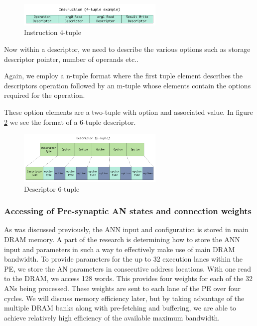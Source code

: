 \documentclass[journal]{IEEEtran}
\begin{document}
\begin{figure}[!t]
\centerline{
\mbox{\includegraphics[width=2.75in]{instructionTuple.jpg}}
}
\caption{Instruction 4-tuple}
\label{fig:instructionTuple}
\end{figure}

Now within a descriptor, we need to describe the various options such as storage descriptor pointer, number of operands etc..

Again, we employ a n-tuple format where the first tuple element describes the descriptors operation followed by an m-tuple whose elements contain the options required for the operation.

These option elements are a two-tuple with option and associated value.
In figure \ref{fig:descriptorTuple} we see the format of a 6-tuple descriptor.

\begin{figure}[!t]
\centerline{
\mbox{\includegraphics[width=2.75in]{descriptorTuple.jpg}}
}
\caption{Descriptor 6-tuple}
\label{fig:descriptorTuple}
\end{figure}



\subsubsection{Accessing of Pre-synaptic AN states and connection weights}
\label{ssec:AccessingANStates}

As was discussed previously, the ANN input and configuration is stored in main DRAM memory. A part of the research is determining how to store the ANN input and parameters in such a way to effectively make use of main DRAM bandwidth. To provide parameters for the up to 32 execution lanes within the PE, we store the AN parameters in consecutive address locations. With one read to the DRAM, we access 128 words. This provides four weights for each of the 32 ANs being processed. These weights are sent to each lane of the PE over four cycles. We will discuss memory efficiency later, but by taking advantage of the multiple DRAM banks along with pre-fetching and buffering, we are able to achieve relatively high efficiency of the available maximum bandwidth.
\end{document}
